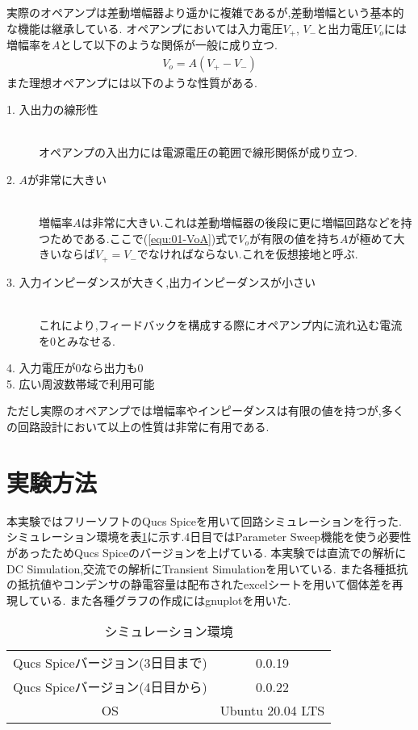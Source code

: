 実際のオペアンプは差動増幅器より遥かに複雑であるが,差動増幅という基本的な機能は継承している.
オペアンプにおいては入力電圧$V_+$, $V_-$と出力電圧$V_o$には増幅率を$A$として以下のような関係が一般に成り立つ.
\begin{align}
  \label{equ:01-VoA}
  V_o=A(V_+-V_-)
\end{align}
\clearpage
また理想オペアンプには以下のような性質がある.
\begin{description}
  \item[1. 入出力の線形性] \mbox{}\\オペアンプの入出力には電源電圧の範囲で線形関係が成り立つ.
  \item[2. $A$が非常に大きい] \mbox{}\\増幅率$A$は非常に大きい.これは差動増幅器の後段に更に増幅回路などを持つためである.ここで(\ref{equ:01-VoA})式で$V_o$が有限の値を持ち$A$が極めて大きいならば$V_+=V_-$でなければならない.これを仮想接地と呼ぶ.
  \item[3. 入力インピーダンスが大きく,出力インピーダンスが小さい] \mbox{}\\これにより,フィードバックを構成する際にオペアンプ内に流れ込む電流を$0$とみなせる.
  \item[4. 入力電圧が$0$なら出力も$0$]
  \item[5. 広い周波数帯域で利用可能]  
\end{description}
ただし実際のオペアンプでは増幅率やインピーダンスは有限の値を持つが,多くの回路設計において以上の性質は非常に有用である.
\section{実験方法}
本実験ではフリーソフトのQucs Spiceを用いて回路シミュレーションを行った.
シミュレーション環境を表\ref{tab:sim_env}に示す.4日目ではParameter Sweep機能を使う必要性があったためQucs Spiceのバージョンを上げている.
本実験では直流での解析にDC Simulation,交流での解析にTransient Simulationを用いている.
また各種抵抗の抵抗値やコンデンサの静電容量は配布されたexcelシートを用いて個体差を再現している.
また各種グラフの作成にはgnuplotを用いた.
\begin{table}[h]
\caption{シミュレーション環境}
\label{tab:sim_env}
\centering
\begin{tabular}{cc}
\hline
Qucs Spiceバージョン(3日目まで)&0.0.19\\
Qucs Spiceバージョン(4日目から)&0.0.22\\
OS&Ubuntu 20.04 LTS\\
\hline
\end{tabular}
\end{table}
